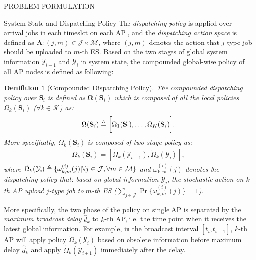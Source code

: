 \documentclass[10pt, conference, letterpaper]{IEEEtran}
\newtheorem{definition}{Denifition}
\newcommand{\define}{\triangleq}
\renewcommand{\vec}{\mathbf}
\DeclarePairedDelimiter{\set}{\{}{\}}
\DeclarePairedDelimiter{\Bracket}{\bigg[}{\bigg]}
\newcommand{\apSet}{\mathcal{K}}
\newcommand{\esSet}{\mathcal{M}}
\newcommand{\jSpace}{\mathcal{J}}
\newcommand{\Stat}{\mathbf{S}}
\newcommand{\Obsv}{\mathcal{Y}}
\newcommand{\Policy}{\mathbf{\Omega}}
\begin{document}
\begin{section}{PROBLEM FORMULATION}
\begin{subsection}{System State and Dispatching Policy}
            The \emph{dispatching policy} is applied over arrival jobs in each timeslot on each AP
            , and the \emph{dispatching action space} is defined as $\vec{A}: (j, m) \in \jSpace \times \esSet$, where $(j, m)$ denotes the action that $j$-type job should be uploaded to $m$-th ES.
            Based on the two stages of global system information $\Obsv_{i-1}$ and $\Obsv_{i}$ in system state, the compounded global-wise policy of all AP nodes is defined as following:
            \begin{definition}[Compounded Dispatching Policy]
                The compounded dispatching policy over $\Stat_{i}$ is defined as $\Policy(\Stat_{i})$ which is composed of all the local policies $\Omega_k(\Stat_{i})$ ($\forall k\in\apSet$) as:
                \begin{align}
                    \vec{\Omega}(\Stat_{i}) \define \Bracket{\Omega_1(\Stat_{i}), \dots, \Omega_K(\Stat_{i})}.
                \end{align}
                More specifically, $\Omega_k(\Stat_{i})$ is composed of two-stage policy as:
                \begin{align}
                    \Omega_k(\Stat_i) = [\tilde{\Omega}_k(\Obsv_{i-1}), \tilde{\Omega}_k(\Obsv_{i})],
                \end{align}
                where $\tilde{\Omega}_k(\Obsv_{i}) \define \set{\omega^{(i)}_{k,m}(j)|\forall j\in\jSpace, \forall m\in\esSet}$ and $\omega^{(i)}_{k,m}(j)$ denotes the dispatching policy that: based on global information $\Obsv_{i}$, the stochastic action on $k$-th AP upload $j$-type job to $m$-th ES ($\sum_{j\in\jSpace} \Pr\{\omega^{(i)}_{k,m}(j)\}=1$).
            \end{definition}
            More specifically, the two phase of the policy on single AP is separated by the \emph{maximum broadcast delay} $\hat{d}_k$ to $k$-th AP, i.e. the time point when it receives the latest global information. For example, in the broadcast interval $[t_{i}, t_{i+1}]$, $k$-th AP will apply policy $\tilde{\Omega}_k(\Obsv_{i})$ based on obsolete information before maximum delay $\hat{d}_k$ and apply $\tilde{\Omega}_k(\Obsv_{i+1})$ immediately after the delay.
        \end{subsection}


\end{section}
\end{document}
